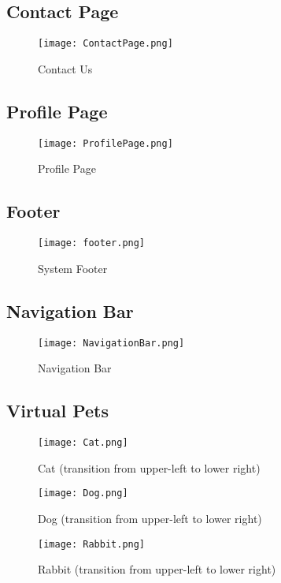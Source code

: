 \newpage
\subsection{Contact Page}

\begin{figure}[h]                
	\centering                   
	\texttt{[image: ContactPage.png]}      
	\caption{Contact Us}
	\label{fig:disneystock}
\end{figure}

\subsection{Profile Page}

\begin{figure}[h]                
	\centering                   
	\texttt{[image: ProfilePage.png]}      
	\caption{Profile Page}
	\label{fig:disneystock}
\end{figure}

\newpage
\subsection{Footer}

\begin{figure}[h]                
	\centering                   
	\texttt{[image: footer.png]}      
	\caption{System Footer}
	\label{fig:disneystock}
\end{figure}

\subsection{Navigation Bar}
\begin{figure}[h]                
	\centering                   
	\texttt{[image: NavigationBar.png]}    
	\caption{Navigation Bar}
	\label{fig:disneystock}
\end{figure}

\newpage
\subsection{Virtual Pets}
\begin{figure}[h]                
	\centering                   
	\texttt{[image: Cat.png]}    
	\caption{Cat (transition from upper-left to lower right)}
	\label{fig:disneystock}
\end{figure}

\begin{figure}[h]                
	\centering                   
	\texttt{[image: Dog.png]}    
	\caption{Dog (transition from upper-left to lower right)}
	\label{fig:disneystock}
\end{figure}

\begin{figure}[h]                
	\centering                   
	\texttt{[image: Rabbit.png]}    
	\caption{Rabbit (transition from upper-left to lower right)}
	\label{fig:disneystock}
\end{figure}



